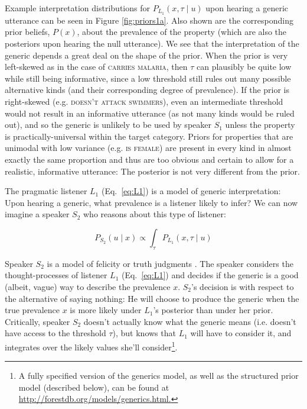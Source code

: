 \documentclass[12pt,letterpaper]{article}
\begin{document}
Example interpretation distributions for $P_{L_{1}}(x , \tau \mid u)$ upon hearing a generic utterance can be seen in Figure \ref{fig:priors1a}. 
Also shown are the corresponding prior beliefs, $P(x)$, about the prevalence of the property (which are also the posteriors upon hearing the null utterance).
We see that the interpretation of the generic depends a great deal on the shape of the prior.
When the prior is very left-skewed as in the case of \textsc{carries malaria}, then $\tau$ can plausibly be quite low while still being informative, since a low threshold still rules out many possible alternative kinds (and their corresponding degree of prevalence).
If the prior is right-skewed (e.g. \textsc{doesn't attack swimmers}), even an intermediate threshold would not result in an informative utterance (as not many kinds would be ruled out), and so the generic is unlikely to be used by speaker $S_1$ unless the property is practically-universal within the target category. 
Priors for properties that are unimodal with low variance (e.g. \textsc{is female}) are present in every kind in almost exactly the same proportion and thus are too obvious and certain to allow for a realistic, informative utterance: The posterior is not very different from the prior. 

The pragmatic listener $L_1$ (Eq.~\ref{eq:L1}) is a model of generic interpretation: Upon hearing a generic, what prevalence is a listener likely to infer?
We can now imagine a speaker $S_2$ who reasons about this type of listener: 

\begin{equation} 
P_{S_{2}}(u \mid x) \propto  \int_{\tau} P_{L_{1}}(x , \tau \mid u) %
\label{eq:S2}
\end{equation}

Speaker $S_2$ is a model of felicity or truth judgments \cite{Degen2014}.
The speaker considers the thought-processes of listener $L_1$ (Eq.~\ref{eq:L1}) and decides if the generic is a good (albeit, vague) way to describe the prevalence $x$. 
$S_2$'s decision is with respect to the alternative of saying nothing: He will choose to produce the generic when the true prevalence $x$ is more likely under $L_1$'s posterior than under her prior. 
Critically, speaker $S_{2}$ doesn't actually know what the generic means (i.e. doesn't have access to the threshold $\tau$), but knows that $L_{1}$ will have to consider it, and integrates over the likely values she'll consider\footnote{A fully specified version of the generics model, as well as the structured prior model (described below), can be found at \url{http://forestdb.org/models/generics.html.}}.
\end{document}
